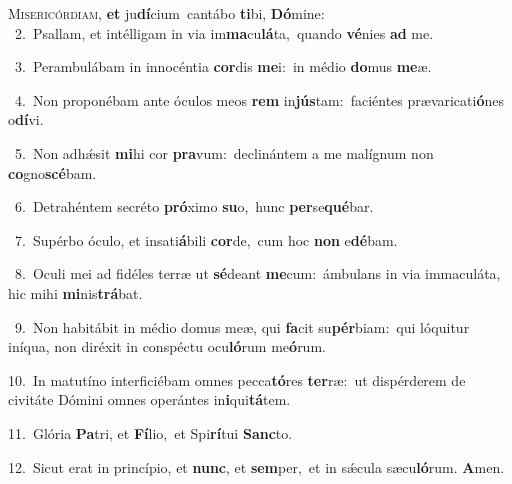 \lettrine{\initial\textcolor{\initialcolor}{M}}{isericórdiam,} \textbf{et} ju\-\textbf{dí}\-cium~\star cantábo \textbf{ti}\-bi, \textbf{Dó}\-mine:\\
{\numbfont\textcolor{\numbcolor}{~2.}}~Psallam, et intélligam in via im\-\textbf{ma}\-cu\-\textbf{lá}\-ta,~\star quando \textbf{vé}\-nies \textbf{ad} me.\par
{\numbfont\textcolor{\numbcolor}{~3.}}~Perambulábam in innocéntia \textbf{cor}\-dis \textbf{me}\-i:~\star in médio \textbf{do}\-mus \textbf{me}\-æ.\par
{\numbfont\textcolor{\numbcolor}{~4.}}~Non proponébam ante óculos meos \textbf{rem} in\-\textbf{jús}\-tam:~\star faciéntes prævaricati\-\textbf{ó}\-nes o\-\textbf{dí}\-vi.\par
{\numbfont\textcolor{\numbcolor}{~5.}}~Non adhǽsit \textbf{mi}\-hi cor \textbf{pra}\-vum:~\star declinántem a me malígnum non \textbf{co}\-gno\-\textbf{scé}\-bam.\par
{\numbfont\textcolor{\numbcolor}{~6.}}~Detrahéntem secréto \textbf{pró}\-ximo \textbf{su}\-o,~\star hunc \textbf{per}\-se\-\textbf{qué}\-bar.\par
{\numbfont\textcolor{\numbcolor}{~7.}}~Supérbo óculo, et insati\-\textbf{á}\-bili \textbf{cor}\-de,~\star cum hoc \textbf{non} e\-\textbf{dé}\-bam.\par
{\numbfont\textcolor{\numbcolor}{~8.}}~Oculi mei ad fidéles terræ ut \textbf{sé}\-deant \textbf{me}\-cum:~\star ámbulans in via immaculáta, hic mihi \textbf{mi}\-nis\-\textbf{trá}\-bat.\par
{\numbfont\textcolor{\numbcolor}{~9.}}~Non habitábit in médio domus meæ, qui \textbf{fa}\-cit su\-\textbf{pér}\-biam:~\star qui lóquitur iníqua, non diréxit in conspéctu ocu\-\textbf{ló}\-rum me\-\textbf{ó}\-rum.\par
{\numbfont\textcolor{\numbcolor}{10.}}~In matutíno interficiébam omnes pecca\-\textbf{tó}\-res \textbf{ter}\-ræ:~\star ut dispérderem de civitáte Dómini omnes operántes in\-\textbf{i}\-qui\-\textbf{tá}\-tem.\par
{\numbfont\textcolor{\numbcolor}{11.}}~Glória \textbf{Pa}\-tri, et \textbf{Fí}\-lio,~\star et Spi\-\textbf{rí}\-tui \textbf{Sanc}\-to.\par
{\numbfont\textcolor{\numbcolor}{12.}}~Sicut erat in princípio, et \textbf{nunc}\-, et \textbf{sem}\-per,~\star et in sǽcula sæcu\-\textbf{ló}\-rum. \textbf{A}\-men.\par
